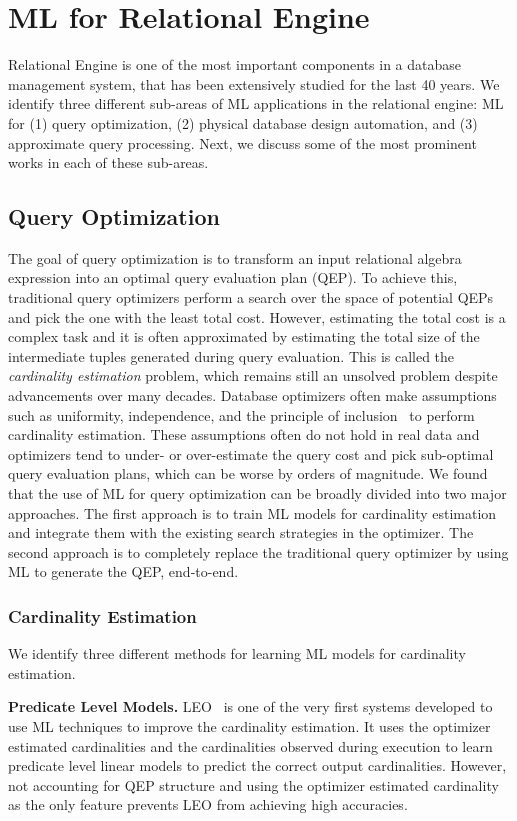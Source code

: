 \section{ML for Relational Engine}
Relational Engine is one of the most important components in a database management system,  that has been extensively studied for the last 40 years.
We identify three different sub-areas of ML applications in the relational engine: ML for (1) query optimization, (2) physical database design automation, and (3) approximate query processing.
Next, we discuss some of the most prominent works in each of these sub-areas.

\subsection{Query Optimization}
The goal of query optimization is to transform an input relational algebra expression into an optimal query evaluation plan (QEP).
To achieve this, traditional query optimizers perform a search over the space of potential QEPs and pick the one with the least total cost.
However, estimating the total cost is a complex task and it is often approximated by estimating the total size of the intermediate tuples generated during query evaluation.
This is called the \textit{cardinality estimation} problem, which remains still an unsolved problem despite advancements over many decades. 
Database optimizers often make assumptions such as uniformity, independence, and the principle of inclusion~\cite{leis2018query} to perform cardinality estimation.
These assumptions often do not hold in real data and optimizers tend to under- or over-estimate the query cost and pick sub-optimal query evaluation plans, which can be worse by orders of magnitude.
We found that the use of ML for query optimization can be broadly divided into two major approaches.
The first approach is to train ML models for cardinality estimation and integrate them with the existing search strategies in the optimizer.
The second approach is to completely replace the traditional query optimizer by using ML to generate the QEP, end-to-end.

\subsubsection{Cardinality Estimation}
We identify three different methods for learning ML models for cardinality estimation.

\vspace{2mm}
\noindent \textbf{Predicate Level Models.} LEO~\cite{leo} is one of the very first systems developed to use ML techniques to improve the cardinality estimation.
It uses the optimizer estimated cardinalities and the cardinalities observed during execution to learn predicate level linear models to predict the correct output cardinalities.
However, not accounting for QEP structure and using the optimizer estimated cardinality as the only feature prevents LEO from achieving high accuracies.

